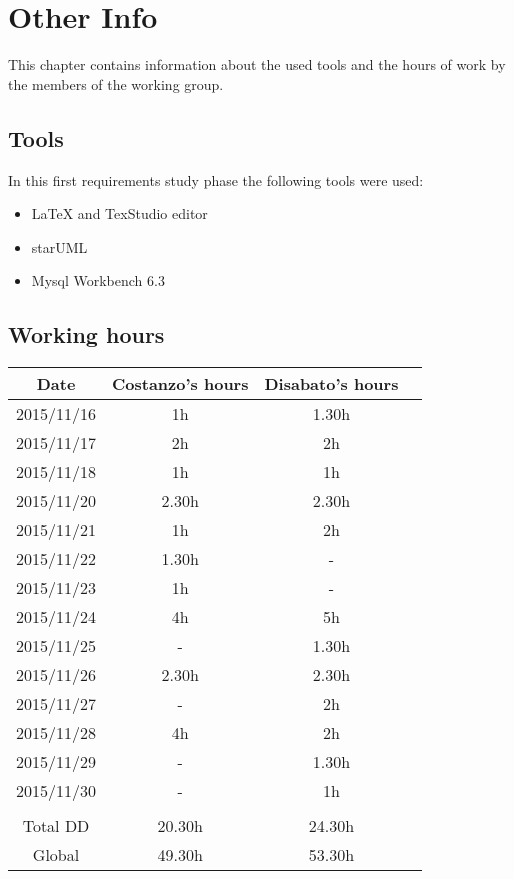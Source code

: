\documentclass[\mainpath/main]{subfiles}
\begin{document}
\chapter{Other Info}
\label{other_info}

\setmyfancystyle

This chapter contains information about the used tools and the hours of work by the members of the working group.

\section{Tools}
In this first requirements study phase the following tools were used:
\begin{itemize}
	\item \LaTeX{} and TexStudio editor
	\item starUML
	\item Mysql Workbench 6.3
\end{itemize}

\clearpage

\section{Working hours}
\begin{table}[h!]
	\centering
\begin{tabular}{cccc}
\hline
Date & 		 Costanzo's hours & Disabato's hours  & \\ \hline
2015/11/16 & 1h 			  & 1.30h 			  & \\ \hline
2015/11/17 & 2h 			  & 2h 				  & \\ \hline 
2015/11/18 & 1h 			  & 1h 				  & \\ \hline
2015/11/20 & 2.30h 			  & 2.30h 			  & \\ \hline
2015/11/21 & 1h 			  & 2h 				  & \\ \hline
2015/11/22 & 1.30h 			  & - 				  & \\ \hline
2015/11/23 & 1h				  & -                 & \\ \hline
2015/11/24 & 4h				  & 5h				  & \\ \hline
2015/11/25 & -				  & 1.30h				  & \\ \hline
2015/11/26 & 2.30h				  & 2.30h				  & \\ \hline
2015/11/27 & -				  & 2h				  & \\ \hline
2015/11/28 & 4h				  & 2h				  & \\ \hline
2015/11/29 & -				  & 1.30h				  & \\ \hline
2015/11/30 & -                & 1h 					& \\ \hline
\\
Total DD   & 20.30h 			  & 24.30h 				  & \\ \hline
Global 	   & 49.30h 		  	  & 53.30h 			  & \\ \hline

\end{tabular}
\end{table}
\end{document}
